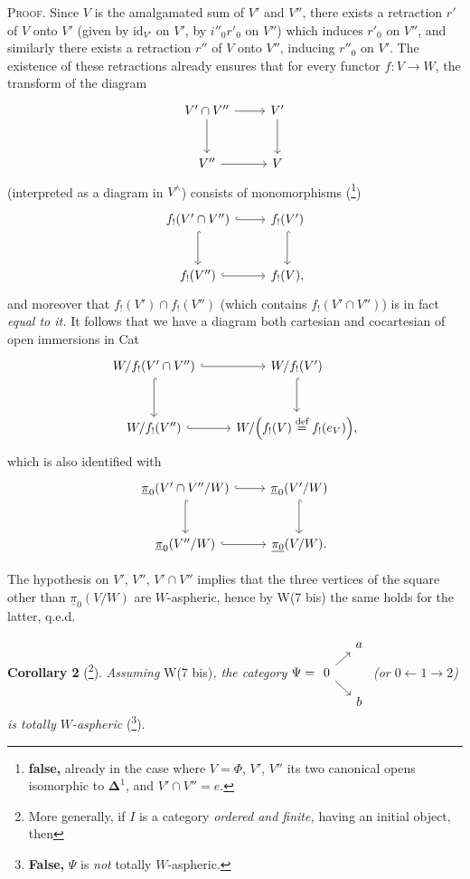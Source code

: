 \documentclass[11pt]{article}
\newcommand{\printedpage}[1]{\marginpar{\footnotesize p.~#1}}
\newcommand{\msp}[1]{\marginpar{\footnotesize [#1]}}
\newcommand{\upi}{\underline{\pi}}
\newcommand{\bDelta}{\boldsymbol{\Delta}}
\begin{document}
\textsc{Proof}. Since $V$ is the amalgamated sum of $V'$ and $V''$, there exists a retraction $r'$ of $V$ onto $V'$ (given by $\mathrm{id}_{V'}$ on $V'$, by $i''_0r'_0$ on $V''$) which induces $r'_0$ on $V''$, and similarly there exists
\msp{page 99}
a retraction $r''$ of $V$ onto $V''$, inducing $r''_0$ on $V'$. The existence of these retractions already ensures that for every functor $f : V \longrightarrow W$, the transform of the diagram
\[
\begin{tikzcd}[row sep=large]
V'\cap V'' \arrow[r] \arrow[d] & V' \arrow[d] \\
V'' \arrow[r] & V
\end{tikzcd}
\]
(interpreted as a diagram in $V^\wedge$) consists of monomorphisms (\footnote{\textbf{false,} already in the case where $V = \Phi$, $V'$, $V''$ its two canonical opens isomorphic to $\bDelta^1$, and $V'{\cap}V'' = e$.}) %
\[
\begin{tikzcd}[row sep=large]
f_!(V'\cap V'') \arrow[r, hook] \arrow[d, hook] & f_!(V') \arrow[d, hook] \\
f_!(V'') \arrow[r, hook] & f_!(V),
\end{tikzcd}
\]
and moreover that $f_!(V') \cap f_!(V'')$ (which contains $f_!(V'\cap V'')$) is in fact \textit{equal to it.} It follows that we have a diagram both cartesian and cocartesian of open immersions in Cat
\printedpage{70}
\[
\begin{tikzcd}[row sep=large]
W/f_!(V'\cap V'') \arrow[r, hook] \arrow[d, hook] & W/f_!(V') \arrow[d, hook] \\
W/f_!(V'') \arrow[r, hook] & W/\Bigl(f_!(V) \overset{\text{def}}{=} f_!(e_V)\Bigr),
\end{tikzcd}
\]
which is also identified with
\[
\begin{tikzcd}[row sep=large]
\upi_0(V'\cap V''/W) \arrow[r, hook] \arrow[d, hook] & \upi_0(V'/W) \arrow[d, hook] \\
\upi_0(V''/W) \arrow[r, hook] & \underline{\pi_0}(V/W).
\end{tikzcd}
\]

\msp{page 100}
The hypothesis on $V'$, $V''$, $V'\cap V''$ implies that the three vertices of the square other than $\upi_0(V/W)$ are $W$-aspheric, hence by W(7 bis) the same holds for the latter, q.e.d.

\textbf{Corollary 2} (\footnote{More generally, if $I$ is a category \textit{ordered and finite,} having an initial object, then}). \textit{Assuming} W(7 bis)\textit{, the category} $\Psi = \begin{tikzcd}[ampersand replacement=\&, row sep=small, column sep=small, baseline=(B.base)]
 \& a \\
|[alias=B]| 0 \arrow[ur] \arrow[dr] \& \\
 \& b
\end{tikzcd}$ \textit{(or $0 \longleftarrow 1 \longrightarrow 2$) is totally $W$-aspheric} (\footnote{\textbf{False,} $\Psi$ is \textit{not} totally $W$-aspheric.}).
\end{document}

